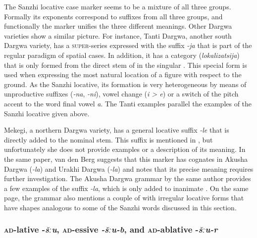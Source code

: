 The Sanzhi locative case marker seems to be a mixture of all three groups. Formally its exponents correspond to suffixes from all three groups, and functionally the marker unifies the three different meanings. Other Dargwa varieties show a similar picture. For instance, Tanti Dargwa, another south Dargwa variety, has a \textsc{super}-series expressed with the suffix \textit{-ja} that is part of the regular paradigm of spatial cases. In addition, it has a category  (\textit{lokalizatsija}) that is only formed from the direct stem of  in the singular \citep[66]{Sumbatova.Lander2014}. This special form is used when expressing the most natural location of a figure with respect to the ground. As the Sanzhi locative, its formation is very heterogeneous by means of unproductive suffixes (\textit{-na}, \textit{-ni}), vowel change (\textit{i > e}) or a switch of the pitch accent to the word final vowel \textit{a}. The Tanti examples parallel the examples of the Sanzhi locative given above.

Mekegi, a northern Dargwa variety, has a general locative suffix \textit{-le} that is directly added to the nominal stem. This suffix is mentioned in , but unfortunately she does not provide examples or a description of its meaning. In the same paper, van den Berg suggests that this marker has cognates in Akusha Dargwa (\textit{-la}) and Urakhi Dargwa (\textit{-la}) and notes that its precise meaning requires further investigation. The Akusha Dargwa grammar by the same author provides a few examples of the suffix \textit{-la}, which is only added to inanimate  \citep[24]{vandenBerg2001}. On the same page, the grammar also mentions a couple of  with irregular locative forms that have shapes analogous to some of the Sanzhi words discussed in this section.




\subsubsection{\textsc{ad}-lative -\textit{šːu}, \textsc{ad}-essive \textit{-šːu-b}, and \textsc{ad}-ablative -\textit{šːu-r}}
\label{sssec:ad-lative -šːu, ad-essive -šːu-b, and ad-ablative -šːu-r}

